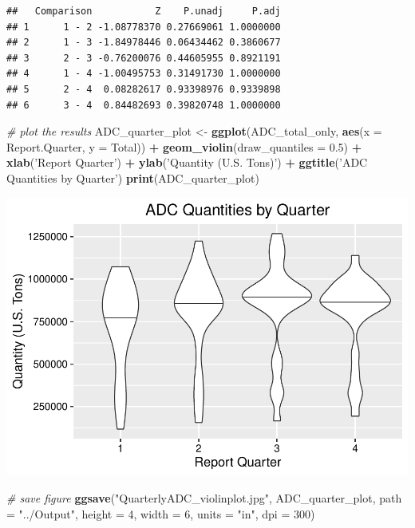\documentclass[12pt,]{article}
\newenvironment{Shaded}{\begin{snugshade}}{\end{snugshade}}
\newcommand{\KeywordTok}[1]{\textcolor[rgb]{0.13,0.29,0.53}{\textbf{#1}}}
\newcommand{\DataTypeTok}[1]{\textcolor[rgb]{0.13,0.29,0.53}{#1}}
\newcommand{\DecValTok}[1]{\textcolor[rgb]{0.00,0.00,0.81}{#1}}
\newcommand{\FloatTok}[1]{\textcolor[rgb]{0.00,0.00,0.81}{#1}}
\newcommand{\StringTok}[1]{\textcolor[rgb]{0.31,0.60,0.02}{#1}}
\newcommand{\CommentTok}[1]{\textcolor[rgb]{0.56,0.35,0.01}{\textit{#1}}}
\newcommand{\OperatorTok}[1]{\textcolor[rgb]{0.81,0.36,0.00}{\textbf{#1}}}
\newcommand{\NormalTok}[1]{#1}
\begin{document}
\begin{verbatim}
##   Comparison           Z    P.unadj     P.adj
## 1      1 - 2 -1.08778370 0.27669061 1.0000000
## 2      1 - 3 -1.84978446 0.06434462 0.3860677
## 3      2 - 3 -0.76200076 0.44605955 0.8921191
## 4      1 - 4 -1.00495753 0.31491730 1.0000000
## 5      2 - 4  0.08282617 0.93398976 0.9339898
## 6      3 - 4  0.84482693 0.39820748 1.0000000
\end{verbatim}

\begin{Shaded}
\begin{Highlighting}[]
\CommentTok{# plot the results}
\NormalTok{ADC_quarter_plot <-}\StringTok{ }\KeywordTok{ggplot}\NormalTok{(ADC_total_only, }\KeywordTok{aes}\NormalTok{(}\DataTypeTok{x =}\NormalTok{ Report.Quarter, }\DataTypeTok{y =}\NormalTok{ Total)) }\OperatorTok{+}
\StringTok{  }\KeywordTok{geom_violin}\NormalTok{(}\DataTypeTok{draw_quantiles =} \FloatTok{0.5}\NormalTok{) }\OperatorTok{+}\StringTok{ }
\StringTok{  }\KeywordTok{xlab}\NormalTok{(}\StringTok{'Report Quarter'}\NormalTok{) }\OperatorTok{+}\StringTok{ }
\StringTok{  }\KeywordTok{ylab}\NormalTok{(}\StringTok{'Quantity (U.S. Tons)'}\NormalTok{) }\OperatorTok{+}\StringTok{ }
\StringTok{  }\KeywordTok{ggtitle}\NormalTok{(}\StringTok{'ADC Quantities by Quarter'}\NormalTok{)}
\KeywordTok{print}\NormalTok{(ADC_quarter_plot)}
\end{Highlighting}
\end{Shaded}

\includegraphics{SKo_Project_Template_files/figure-latex/Test1-5.pdf}

\begin{Shaded}
\begin{Highlighting}[]
\CommentTok{# save figure}
\KeywordTok{ggsave}\NormalTok{(}\StringTok{"QuarterlyADC_violinplot.jpg"}\NormalTok{, ADC_quarter_plot, }\DataTypeTok{path =} \StringTok{"../Output"}\NormalTok{, }\DataTypeTok{height =} \DecValTok{4}\NormalTok{, }\DataTypeTok{width =} \DecValTok{6}\NormalTok{, }\DataTypeTok{units =} \StringTok{"in"}\NormalTok{, }\DataTypeTok{dpi =} \DecValTok{300}\NormalTok{)}
\end{Highlighting}
\end{Shaded}
\end{document}
